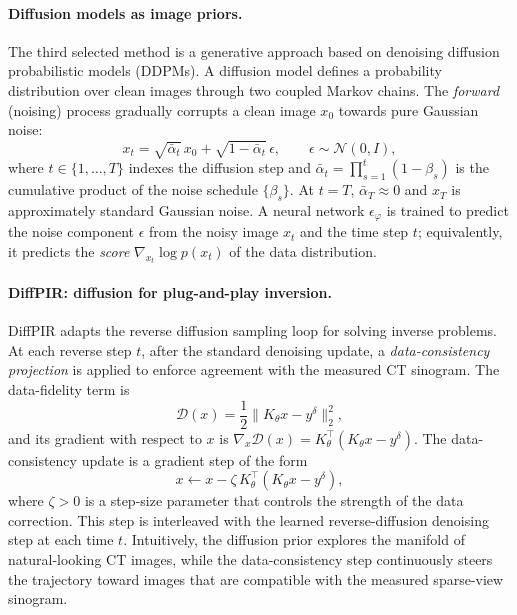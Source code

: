 \documentclass[11pt,a4paper]{article}
\begin{document}
\paragraph{Diffusion models as image priors.}
The third selected method is a generative approach based on denoising diffusion
probabilistic models (DDPMs). A diffusion model defines a probability
distribution over clean images through two coupled Markov chains. The
\emph{forward} (noising) process gradually corrupts a clean image $x_0$
towards pure Gaussian noise:
\begin{equation}
  x_t
  =
  \sqrt{\bar{\alpha}_t}\,x_0
  +
  \sqrt{1-\bar{\alpha}_t}\,\epsilon,
  \qquad
  \epsilon \sim \mathcal{N}(0,I),
  \label{eq:diffusion-forward}
\end{equation}
where $t \in \{1,\ldots,T\}$ indexes the diffusion step and
$\bar{\alpha}_t = \prod_{s=1}^{t}(1-\beta_s)$ is the cumulative product of the
noise schedule $\{\beta_s\}$. At $t=T$, $\bar{\alpha}_T \approx 0$ and $x_T$
is approximately standard Gaussian noise. A neural network $\epsilon_\varphi$
is trained to predict the noise component $\epsilon$ from the noisy image $x_t$
and the time step $t$; equivalently, it predicts the \emph{score}
$\nabla_{x_t}\log p(x_t)$ of the data distribution.

\paragraph{DiffPIR: diffusion for plug-and-play inversion.}
DiffPIR \cite{zhu2023denoising} adapts the reverse diffusion sampling loop for
solving inverse problems. At each reverse step $t$, after the standard
denoising update, a \emph{data-consistency projection} is applied to enforce
agreement with the measured CT sinogram. The data-fidelity term is
\begin{equation}
  \mathcal{D}(x)
  =
  \frac{1}{2}\|K_\theta x - y^{\delta}\|_2^2,
  \label{eq:diffpir-data-consistency}
\end{equation}
and its gradient with respect to $x$ is
$\nabla_x \mathcal{D}(x) = K_\theta^\top(K_\theta x - y^{\delta})$.
The data-consistency update is a gradient step of the form
\begin{equation}
  x \leftarrow x - \zeta\, K_\theta^\top(K_\theta x - y^{\delta}),
  \label{eq:diffpir-gradient-step}
\end{equation}
where $\zeta > 0$ is a step-size parameter that controls the strength of the
data correction. This step is interleaved with the learned reverse-diffusion
denoising step at each time $t$. Intuitively, the diffusion prior explores the
manifold of natural-looking CT images, while the data-consistency step
continuously steers the trajectory toward images that are compatible with the
measured sparse-view sinogram.
\end{document}
